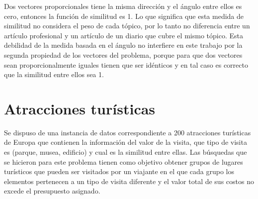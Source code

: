 Dos vectores proporcionales tiene la misma dirección y el ángulo entre ellos es cero, entonces la función de similitud es 1. Lo que significa que esta medida de similitud no considera el peso de cada tópico, por lo tanto no diferencia entre un artículo profesional y un artículo de un diario que cubre el mismo tópico. Esta debilidad de la medida basada en el ángulo no interfiere en este trabajo por la segunda propiedad de los vectores del problema, porque para que dos vectores sean proporcionalmente iguales tienen que ser idénticos y en tal caso es correcto que la similitud entre ellos sea 1.
\section{Atracciones turísticas}
Se dispuso de una instancia de datos correspondiente a 200 atracciones turísticas de Europa que contienen la información del valor de la visita, que tipo de visita es (parque, musea, edificio) y cual es la similitud entre ellas. Las búsquedas que se hicieron para este problema tienen como objetivo obtener grupos de lugares turísticos que pueden ser visitados por un viajante en el que cada grupo los elementos pertenecen a un tipo de visita diferente y el valor total de sus costos no excede el presupuesto asignado.\\
